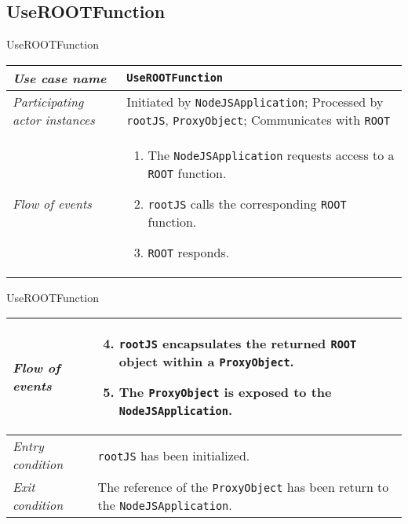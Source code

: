 \subsection{UseROOTFunction}
\begin{frame}{UseROOTFunction}
        \begin{longtable}{p{3cm} @{\hskip 1cm} p{7cm}}
                \hline

                \textit{Use case name} & \texttt{UseROOTFunction}\\
                \hline

                \textit{Participating actor instances} & Initiated by \texttt{NodeJSApplication}; Processed by \texttt{rootJS}, \texttt{ProxyObject}; Communicates with \texttt{ROOT}\\
                \hline
                                \pause

                \textit{Flow of events} &
                        \begin{enumerate}
                                \item The \texttt{NodeJSApplication} requests access to a \texttt{ROOT} function.
                                \pause
                                \item \texttt{rootJS} calls the corresponding \texttt{ROOT} function.
                                \pause
                                \item \texttt{ROOT} responds.
                        \end{enumerate}
                        \\
        \end{longtable}
\end{frame}
\begin{frame}[t]{UseROOTFunction}
        \begin{longtable}{p{3cm} @{\hskip 1cm} p{7cm}}
                \textit{Flow of events} &
                        \begin{enumerate}
                                \setcounter{enumi}{3}
                                \item \texttt{rootJS} encapsulates the returned \texttt{ROOT} object within a \texttt{ProxyObject}.
                                \pause
                                \item The \texttt{ProxyObject} is exposed to the \texttt{NodeJSApplication}.
                        \end{enumerate}
                       \\
                \hline

                \textit{Entry condition} & \texttt{rootJS} has been initialized.\\
                \hline

                \textit{Exit condition} & The reference of the \texttt{ProxyObject} has been return to the \texttt{NodeJSApplication}.\\
                \hline
        \end{longtable}
\end{frame}


